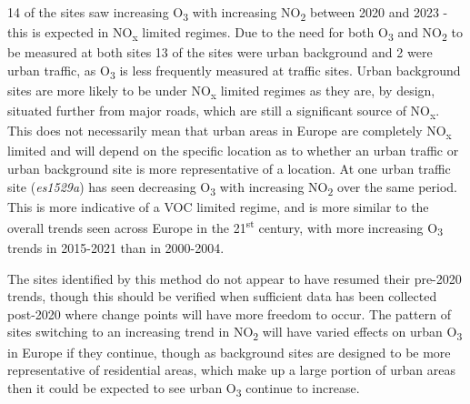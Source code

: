 \documentclass[journal abbreviation, manuscript]{copernicus}
\begin{document}
14 of the sites saw increasing O\textsubscript{3} with increasing NO\textsubscript{2} between 2020 and 2023 - this is expected in NO\textsubscript{x} limited regimes. Due to the need for both O\textsubscript{3} and NO\textsubscript{2} to be measured at both sites 13 of the sites were urban background and 2 were urban traffic, as O\textsubscript{3} is less frequently measured at traffic sites. Urban background sites are more likely to be under NO\textsubscript{x} limited regimes as they are, by design, situated further from major roads, which are still a significant source of NO\textsubscript{x}. This does not necessarily mean that urban areas in Europe are completely NO\textsubscript{x} limited and will depend on the specific location as to whether an urban traffic or urban background site is more representative of a location. At one urban traffic site (\textit{es1529a}) has seen decreasing O\textsubscript{3} with increasing NO\textsubscript{2} over the same period. This is more indicative of a VOC limited regime, and is more similar to the overall trends seen across Europe in the 21\textsuperscript{st} century, with more increasing O\textsubscript{3} trends in 2015-2021 than in 2000-2004. 

The sites identified by this method do not appear to have resumed their pre-2020 trends, though this should be verified when sufficient data has been collected post-2020 where change points will have more freedom to occur. The pattern of sites switching to an increasing trend in NO\textsubscript{2} will have varied effects on urban O\textsubscript{3} in Europe if they continue, though as background sites are designed to be more representative of residential areas, which make up a large portion of urban areas then it could be expected to see urban O\textsubscript{3} continue to increase. 
\end{document}

